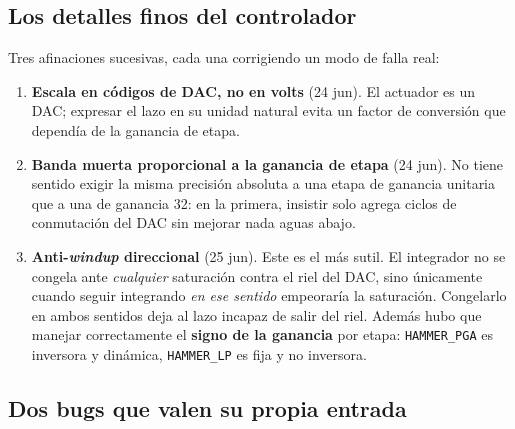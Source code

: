 \subsection{Los detalles finos del controlador}

Tres afinaciones sucesivas, cada una corrigiendo un modo de falla real:

\begin{enumerate}[itemsep=0.3em]
\item \textbf{Escala en c\'odigos de DAC, no en volts} (24 jun). El actuador es
un DAC; expresar el lazo en su unidad natural evita un factor de conversi\'on
que dependía de la ganancia de etapa.

\item \textbf{Banda muerta proporcional a la ganancia de etapa} (24 jun). No
tiene sentido exigir la misma precisi\'on absoluta a una etapa de ganancia
unitaria que a una de ganancia 32: en la primera, insistir solo agrega ciclos
de conmutaci\'on del DAC sin mejorar nada aguas abajo.

\item \textbf{Anti-\emph{windup} direccional} (25 jun). Este es el m\'as sutil.
El integrador no se congela ante \emph{cualquier} saturaci\'on contra el riel
del DAC, sino \'unicamente cuando seguir integrando \emph{en ese sentido}
empeorar\'ia la saturaci\'on. Congelarlo en ambos sentidos deja al lazo incapaz
de salir del riel. Adem\'as hubo que manejar correctamente el \textbf{signo de
la ganancia} por etapa: \texttt{HAMMER\_PGA} es inversora y din\'amica,
\texttt{HAMMER\_LP} es fija y no inversora.
\end{enumerate}


\subsection{Dos bugs que valen su propia entrada}


